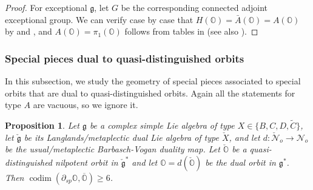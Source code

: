 \documentclass[11pt, a4paper]{amsart}
\newcommand{\g}{\mathfrak{g}}
\newcommand{\orb}{\mathbb{O}}
\newcommand{\fg}{\mathfrak{g}}
\newcommand{\ckfg}{{\check{\fg}}}
\newcommand{\ckorb}{\check{\orb}}
\newcommand{\cN}{\mathcal{N}}
\newcommand{\Abar}{\bar{A}}
\DeclareMathOperator{\codim}{codim}
\DeclareMathOperator{\Sing}{Sing}
\newcommand{\mC}{\widetilde{C}}
\newtheorem{Prop}[Thm]{Proposition}
\theoremstyle{definition}
\newtheorem{Rem}[Thm]{Remark}
\numberwithin{equation}{section}
\begin{document}
\begin{proof}
	For exceptional $\g$, let $G$ be the corresponding connected adjoint exceptional group. We can verify case by case that $H(\orb) = \Abar(\orb) = A(\orb)$ by \cite{Lusztig:unipotent} and \cite{JLSY:SpecialPiece}, and $A(\orb) = \pi_1(\orb)$ follows from tables in \cite{Alexeevski} (see also \cite[Section 8.4]{CM}).
\end{proof}



\subsubsection{Special pieces dual to quasi-distinguished orbits}
\label{subsec:special_piece_dist}

In this subsection, we study the geometry of special pieces associated to special orbits that are dual to quasi-distinguished orbits. Again all the statements for type $A$ are vacuous, so we ignore it. 

\begin{Prop}\label{prop:codim_sp_classical}
	Let $\fg$ be a complex simple Lie algebra of type $X \in \{B, C, D, \mC\}$, let $\ckfg$ be its Langlands/metaplectic dual Lie algebra of type $\check{X}$, and let $d: \check{\cN}_o \to \cN_o$ be the usual/metaplectic Barbasch-Vogan duality map. Let $\ckorb$ be a quasi-distinguished nilpotent orbit in $\ckfg^*$ and let $\orb = d(\ckorb)$ be the dual orbit in $\fg^*$. Then $\codim(\partial_{sp} \orb, \overline{\orb}) \geqslant 6$.
\end{Prop}
\end{document}
